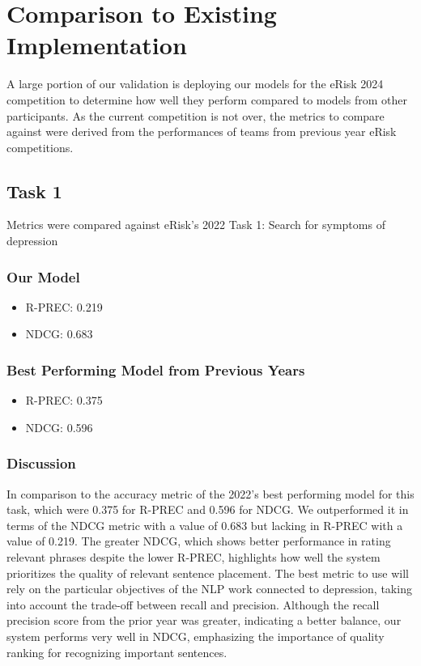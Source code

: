 \documentclass[12pt, titlepage]{article}
\begin{document}
 \section{Comparison to Existing Implementation}


A large portion of our validation is deploying our models for the eRisk 2024 competition to determine how well they perform compared to models from other participants. As the current competition is not over, the metrics to compare against were derived from the performances of teams from previous year eRisk competitions.


\subsection{Task 1}
Metrics were compared against eRisk's 2022 Task 1: Search for symptoms of depression


\subsubsection{Our Model}
\begin{itemize}
\item R-PREC: 0.219
\item NDCG: 0.683
\end{itemize}


\subsubsection{Best Performing Model from Previous Years}
\begin{itemize}
\item R-PREC: 0.375
\item NDCG: 0.596
\end{itemize}


\subsubsection{Discussion}
In comparison to the accuracy metric of the 2022's best performing model for this task, which were 0.375 for R-PREC and 0.596 for NDCG. We outperformed it in terms of the NDCG metric with a value of 0.683 but lacking in R-PREC with a value of 0.219. The greater NDCG, which shows better performance in rating relevant phrases despite the lower R-PREC, highlights how well the system prioritizes the quality of relevant sentence placement. The best metric to use will rely on the particular objectives of the NLP work connected to depression, taking into account the trade-off between recall and precision. Although the recall precision score from the prior year was greater, indicating a better balance, our system performs very well in NDCG, emphasizing the importance of quality ranking for recognizing important sentences.
\end{document}
